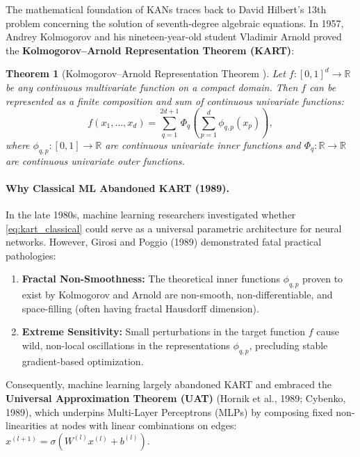 \documentclass[11pt,a4paper]{article}
\theoremstyle{plain}
\newtheorem{theorem}{Theorem}[section]
\theoremstyle{definition}
\theoremstyle{remark}
\begin{document}
The mathematical foundation of KANs traces back to David Hilbert's 13th problem concerning the solution of seventh-degree algebraic equations. In 1957, Andrey Kolmogorov and his nineteen-year-old student Vladimir Arnold proved the \textbf{Kolmogorov--Arnold Representation Theorem (KART)}:

\begin{theorem}[Kolmogorov--Arnold Representation Theorem \cite{kolmogorov1957representation}]
Let $f: [0, 1]^d \to \mathbb{R}$ be any continuous multivariate function on a compact domain. Then $f$ can be represented as a finite composition and sum of continuous univariate functions:
\begin{equation}
    f(x_1, \dots, x_d) = \sum_{q=1}^{2d+1} \Phi_q \left( \sum_{p=1}^d \phi_{q, p}(x_p) \right),
    \label{eq:kart_classical}
\end{equation}
where $\phi_{q, p}: [0, 1] \to \mathbb{R}$ are continuous univariate inner functions and $\Phi_q: \mathbb{R} \to \mathbb{R}$ are continuous univariate outer functions.
\end{theorem}

\paragraph{Why Classical ML Abandoned KART (1989).}
In the late 1980s, machine learning researchers investigated whether \eqref{eq:kart_classical} could serve as a universal parametric architecture for neural networks. However, Girosi and Poggio (1989) \cite{girosi1989representation} demonstrated fatal practical pathologies:
\begin{enumerate}
    \item \textbf{Fractal Non-Smoothness:} The theoretical inner functions $\phi_{q, p}$ proven to exist by Kolmogorov and Arnold are non-smooth, non-differentiable, and space-filling (often having fractal Hausdorff dimension).
    \item \textbf{Extreme Sensitivity:} Small perturbations in the target function $f$ cause wild, non-local oscillations in the representations $\phi_{q, p}$, precluding stable gradient-based optimization.
\end{enumerate}
Consequently, machine learning largely abandoned KART and embraced the \textbf{Universal Approximation Theorem (UAT)} (Hornik et al., 1989; Cybenko, 1989), which underpins Multi-Layer Perceptrons (MLPs) by composing fixed non-linearities at nodes with linear combinations on edges: $x^{(l+1)} = \sigma(W^{(l)} x^{(l)} + b^{(l)})$.
\end{document}
